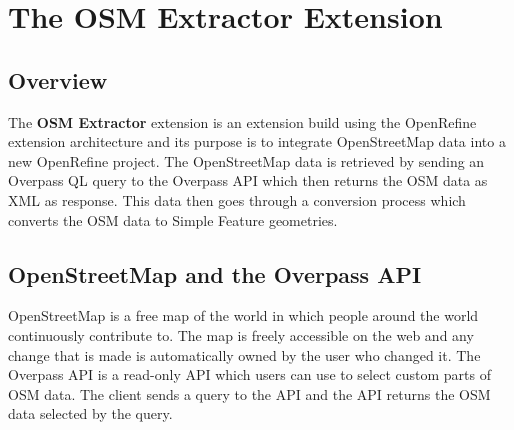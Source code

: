 \chapter{The OSM Extractor Extension}\label{ch:the-osm-extractor-extension}
\section{Overview}
The \textbf{OSM Extractor} extension is an extension build using the OpenRefine extension architecture and its purpose
is to integrate OpenStreetMap data into a new OpenRefine project.
The OpenStreetMap data is retrieved by sending an Overpass QL query to the Overpass API which then
returns the OSM data as XML as response.
This data then goes through a conversion process which converts the OSM data to Simple Feature geometries.

\section{OpenStreetMap and the Overpass API}
OpenStreetMap is a free map of the world in which people around the world continuously contribute to.
The map is freely accessible on the web and any change that is made is automatically owned by the user who changed it.
The Overpass API is a read-only API which users can use to select custom parts of OSM data.
The client sends a query to the API and the API returns the OSM data selected by the query.

